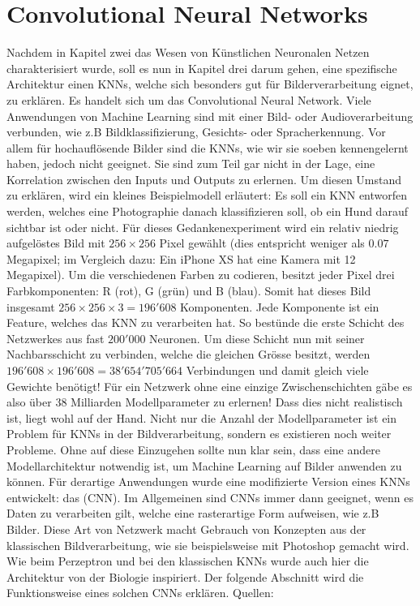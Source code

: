 \chapter{Convolutional Neural Networks}\label{sec:CNN}
Nachdem in Kapitel zwei das Wesen von Künstlichen Neuronalen Netzen
charakterisiert wurde, soll es nun in Kapitel drei darum gehen, eine spezifische
Architektur einen KNNs, welche sich besonders gut für Bilderverarbeitung eignet,
zu erklären. Es handelt sich um das Convolutional Neural Network.
\para{}
\bigskip
Viele Anwendungen von Machine Learning sind mit einer Bild- oder
Audioverarbeitung verbunden, wie z.B Bildklassifizierung, Gesichts- oder
Spracherkennung.
Vor allem für hochauflösende Bilder sind die KNNs, wie wir sie soeben
kennengelernt haben, jedoch nicht geeignet. Sie sind zum Teil gar nicht in der
Lage, eine Korrelation zwischen den Inputs und Outputs zu erlernen.
Um diesen Umstand zu erklären, wird ein kleines Beispielmodell erläutert:
\para{}
\label{sec:CNN_parameter_problem}
Es soll ein KNN entworfen werden, welches eine Photographie danach klassifizieren
soll, ob ein Hund darauf sichtbar ist oder nicht. Für dieses
Gedankenexperiment wird ein relativ niedrig aufgelöstes Bild mit $256 \times 256$
Pixel gewählt (dies entspricht weniger als $0.07$ Megapixel; im Vergleich dazu:
Ein iPhone XS hat eine Kamera mit 12 Megapixel). Um die verschiedenen Farben zu codieren, besitzt jeder Pixel drei
Farbkomponenten: R (rot), G (grün)
und B (blau). Somit hat dieses Bild insgesamt $256 \times 256 \times 3 = 196'608$
Komponenten. Jede Komponente ist ein Feature, welches das KNN zu verarbeiten hat. So bestünde
die erste Schicht des Netzwerkes aus fast $200'000$ Neuronen. Um diese Schicht
nun mit seiner Nachbarsschicht zu verbinden, welche die gleichen Grösse besitzt, werden
$196'608 \times 196'608 = 38'654'705'664$ Verbindungen und damit gleich
viele Gewichte benötigt! Für ein Netzwerk ohne eine einzige Zwischenschichten gäbe es
also über 38 Milliarden Modellparameter zu erlernen! Dass dies nicht realistisch ist,
liegt wohl auf der Hand.
\para{}
Nicht nur die Anzahl der Modellparameter ist ein Problem für KNNs in der
Bildverarbeitung, sondern es existieren noch weiter Probleme.
Ohne auf diese Einzugehen sollte nun klar sein, dass eine andere Modellarchitektur notwendig ist, um Machine
Learning auf Bilder anwenden zu können. Für derartige Anwendungen wurde eine modifizierte
Version eines KNNs entwickelt: das  (CNN).
Im Allgemeinen sind CNNs immer dann geeignet, wenn es Daten zu verarbeiten gilt, welche eine
rasterartige Form aufweisen, wie z.B Bilder.
Diese Art von Netzwerk macht Gebrauch von Konzepten aus der klassischen
Bildverarbeitung, wie sie beispielsweise mit Photoshop gemacht wird.
Wie beim Perzeptron und bei den klassischen KNNs wurde auch hier die Architektur
von der Biologie inspiriert.
Der folgende Abschnitt wird die Funktionsweise eines solchen CNNs erklären.
\para{}
Quellen: \cite{Goodfellow-et-al-2016} \cite{deeplearning.ai:cnn} \cite{wiki:cnn}


